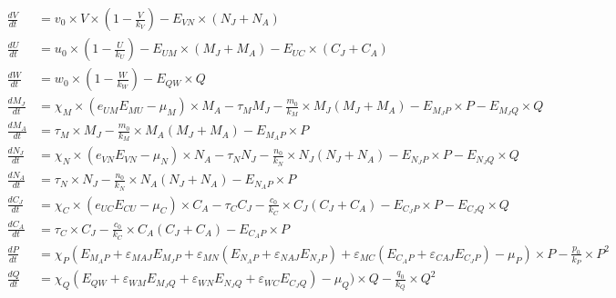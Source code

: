 \begin{equation}
\begin{split}
\label{eq:ens_equations}
	\frac{dV}{dt} &= v_0\times V \times (1-\frac{V}{k_V}) - E_{VN} \times (N_J + N_A) \\
	\frac{dU}{dt} &= u_0 \times (1 - \frac{U}{k_U}) - E_{UM} \times (M_J + M_A) - E_{UC} \times (C_J + C_A)\\
	\frac{dW}{dt} &= w_0 \times (1 - \frac{W}{k_W}) - E_{QW} \times Q\\
	\frac{dM_J}{dt} &= \chi_M \times (e_{UM}E_{MU} - \mu_M) \times M_A - \tau_M M_J - \frac{m_0}{k_M} \times M_J(M_J + M_A) - E_{M_{J}P} \times P - E_{M_{J}Q} \times Q \\ 
	\frac{dM_{A}}{dt} &= \tau_M \times M_J - \frac{m_0}{k_M} \times M_A(M_J + M_A) - E_{M_{A}P} \times P \\
	\frac{dN_J}{dt} &= \chi_N \times (e_{VN}E_{VN} - \mu_N) \times N_A - \tau_N N_J - \frac{n_0}{k_N} \times N_J(N_J + N_A) - E_{N_{J}P} \times P - E_{N_{J}Q} \times Q \\
	\frac{dN_{A}}{dt} &= \tau_N \times N_J - \frac{n_0}{k_N} \times N_A(N_J + N_A) - E_{N_{A}P} \times P \\
	\frac{dC_J}{dt} &= \chi_C \times (e_{UC}E_{CU} - \mu_C) \times C_A - \tau_C C_J - \frac{c_0}{k_C} \times C_J(C_J + C_A) - E_{C_{J}P} \times P - E_{C_{J}Q} \times Q\\
	\frac{dC_{A}}{dt} &= \tau_C \times C_J - \frac{c_0}{k_C} \times C_A(C_J + C_A) - E_{C_{A}P} \times P \\
	\frac{dP}{dt} &= \chi_P(E_{M_{A}P} + \varepsilon_{MAJ}E_{M_{J}P} + \varepsilon_{MN}(E_{N_{A}P} + \varepsilon_{NAJ}E_{N_{J}P}) +\varepsilon_{MC}(E_{C_{A}P}+\varepsilon_{CAJ}E_{C_{J}P})-\mu_P) \times P - \frac{p_0}{k_P} \times P^2 \\
	\frac{dQ}{dt} &= \chi_Q(E_{QW} + \varepsilon_{WM}E_{M_{J}Q} + \varepsilon_{WN}E_{N_{J}Q} + \varepsilon_{WC}E_{C_{J}Q})-\mu_Q) \times Q - \frac{q_0}{k_Q} \times Q^2 \\
\end{split}
\end{equation}